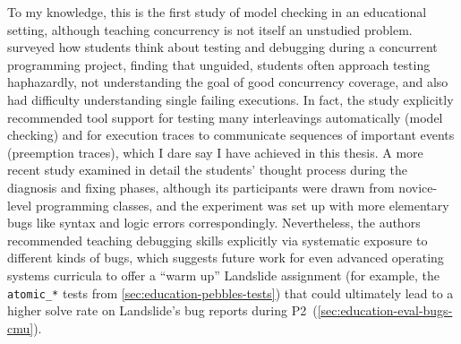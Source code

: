 To my knowledge, this is the first study of model checking in an educational setting,
although teaching concurrency is not itself an unstudied problem.
%
\cite{how-studence} surveyed how students think about
testing and debugging during a concurrent programming project,
finding that unguided, students often approach testing haphazardly,
not understanding the goal of good concurrency coverage,
and also had difficulty understanding single failing executions.
In fact, the study explicitly recommended tool support
for testing many interleavings automatically (model checking)
and for execution traces to communicate sequences of important events (preemption traces),
which I dare say I have achieved in this thesis.
A more recent study \cite{novices-programmers}
examined in detail the students' thought process
during the diagnosis and fixing phases,
although its participants were drawn from novice-level programming classes,
and the experiment was set up with more elementary bugs like syntax and logic errors correspondingly.
Nevertheless, the authors recommended teaching debugging skills explicitly
via systematic exposure to different kinds of bugs,
which suggests future work for even advanced operating systems curricula
to offer a ``warm up'' Landslide assignment
(for example, the {\tt atomic\_*} tests from \cref{sec:education-pebbles-tests})
that could ultimately lead to a higher solve rate on Landslide's bug reports during P2~(\cref{sec:education-eval-bugs-cmu}).
%

